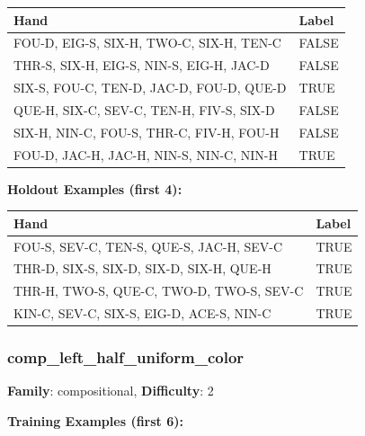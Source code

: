 \documentclass[10pt,a4paper]{article}
\begin{document}
\begin{small}
\begin{tabular}{p{8cm}l}
\toprule
Hand & Label \\
\midrule
FOU-D, EIG-S, SIX-H, TWO-C, SIX-H, TEN-C & \textcolor{negative}{FALSE} \\
THR-S, SIX-H, EIG-S, NIN-S, EIG-H, JAC-D & \textcolor{negative}{FALSE} \\
SIX-S, FOU-C, TEN-D, JAC-D, FOU-D, QUE-D & \textcolor{positive}{TRUE} \\
QUE-H, SIX-C, SEV-C, TEN-H, FIV-S, SIX-D & \textcolor{negative}{FALSE} \\
SIX-H, NIN-C, FOU-S, THR-C, FIV-H, FOU-H & \textcolor{negative}{FALSE} \\
FOU-D, JAC-H, JAC-H, NIN-S, NIN-C, NIN-H & \textcolor{positive}{TRUE} \\
\bottomrule
\end{tabular}
\end{small}

\textbf{Holdout Examples (first 4):}

\begin{small}
\begin{tabular}{p{8cm}l}
\toprule
Hand & Label \\
\midrule
FOU-S, SEV-C, TEN-S, QUE-S, JAC-H, SEV-C & \textcolor{positive}{TRUE} \\
THR-D, SIX-S, SIX-D, SIX-D, SIX-H, QUE-H & \textcolor{positive}{TRUE} \\
THR-H, TWO-S, QUE-C, TWO-D, TWO-S, SEV-C & \textcolor{positive}{TRUE} \\
KIN-C, SEV-C, SIX-S, EIG-D, ACE-S, NIN-C & \textcolor{positive}{TRUE} \\
\bottomrule
\end{tabular}
\end{small}

\vspace{0.5cm}

\subsubsection{comp\_left\_half\_uniform\_color}

\textbf{Family}: compositional, \textbf{Difficulty}: 2

\textbf{Training Examples (first 6):}
\end{document}
